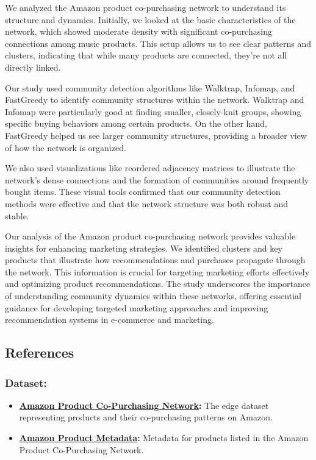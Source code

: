 \documentclass[
]{article}
\begin{document}
We analyzed the Amazon product co-purchasing network to understand its
structure and dynamics. Initially, we looked at the basic
characteristics of the network, which showed moderate density with
significant co-purchasing connections among music products. This setup
allows us to see clear patterns and clusters, indicating that while many
products are connected, they're not all directly linked.

Our study used community detection algorithms like Walktrap, Infomap,
and FastGreedy to identify community structures within the network.
Walktrap and Infomap were particularly good at finding smaller,
closely-knit groups, showing specific buying behaviors among certain
products. On the other hand, FastGreedy helped us see larger community
structures, providing a broader view of how the network is organized.

We also used visualizations like reordered adjacency matrices to
illustrate the network's dense connections and the formation of
communities around frequently bought items. These visual tools confirmed
that our community detection methods were effective and that the network
structure was both robust and stable.

Our analysis of the Amazon product co-purchasing network provides
valuable insights for enhancing marketing strategies. We identified
clusters and key products that illustrate how recommendations and
purchases propagate through the network. This information is crucial for
targeting marketing efforts effectively and optimizing product
recommendations. The study underscores the importance of understanding
community dynamics within these networks, offering essential guidance
for developing targeted marketing approaches and improving
recommendation systems in e-commerce and marketing.

\subsection{References}\label{references}

\subsubsection{Dataset:}\label{dataset}

\begin{itemize}
\item
  \href{https://snap.stanford.edu/data/amazon0601.html}{\textbf{Amazon
  Product Co-Purchasing Network}}\textbf{:} The edge dataset
  representing products and their co-purchasing patterns on Amazon.
\item
  \href{https://snap.stanford.edu/data/amazon-meta.html}{\textbf{Amazon
  Product Metadata}}\textbf{:} Metadata for products listed in the
  Amazon Product Co-Purchasing Network.
\end{itemize}
\end{document}
